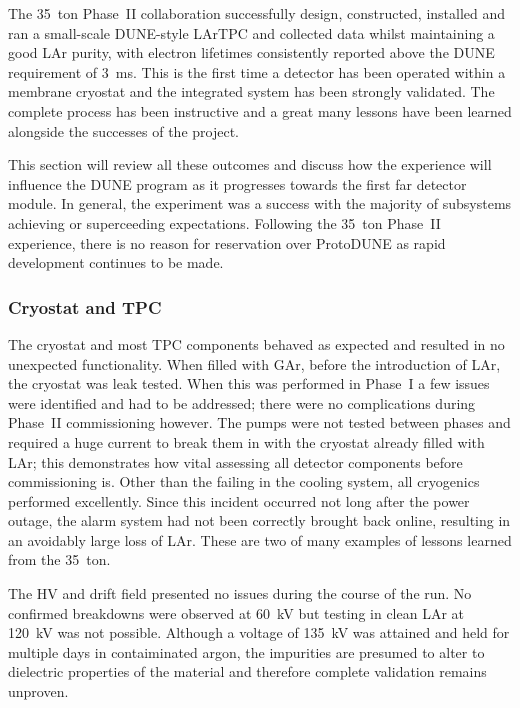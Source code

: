 The 35~ton Phase~II collaboration successfully design, constructed, installed and ran a small-scale DUNE-style LArTPC and collected data whilst maintaining a good LAr purity, with electron lifetimes consistently reported above the DUNE requirement of 3~ms.  This is the first time a detector has been operated within a membrane cryostat and the integrated system has been strongly validated.  The complete process has been instructive and a great many lessons have been learned alongside the successes of the project.

This section will review all these outcomes and discuss how the experience will influence the DUNE program as it progresses towards the first far detector module.  In general, the experiment was a success with the majority of subsystems achieving or superceeding expectations.  Following the 35~ton Phase~II experience, there is no reason for reservation over ProtoDUNE as rapid development continues to be made.

\subsubsection{Cryostat and TPC}\label{sec:35tonPhaseIIOutcomesCryostatTPC}

The cryostat and most TPC components behaved as expected and resulted in no unexpected functionality.  When filled with GAr, before the introduction of LAr, the cryostat was leak tested.  When this was performed in Phase~I a few issues were identified and had to be addressed; there were no complications during Phase~II commissioning however.  The pumps were not tested between phases and required a huge current to break them in with the cryostat already filled with LAr; this demonstrates how vital assessing all detector components before commissioning is.  Other than the failing in the cooling system, all cryogenics performed excellently.  Since this incident occurred not long after the power outage, the alarm system had not been correctly brought back online, resulting in an avoidably large loss of LAr.  These are two of many examples of lessons learned from the 35~ton.

The HV and drift field presented no issues during the course of the run.  No confirmed breakdowns were observed at 60~kV but testing in clean LAr at 120~kV was not possible.  Although a voltage of 135~kV was attained and held for multiple days in contaiminated argon, the impurities are presumed to alter to dielectric properties of the material and therefore complete validation remains unproven.

